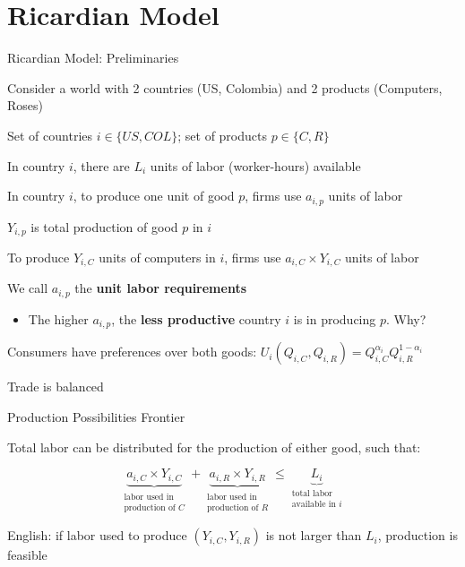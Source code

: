 \documentclass[notes,11pt, aspectratio=169, xcolor=table]{beamer}
\newenvironment{wideitemize}{\itemize\addtolength{\itemsep}{10pt}}{\enditemize}
\begin{document}
\section{Ricardian Model}

\begin{frame}{Ricardian Model: Preliminaries}
\begin{wideitemize}
        \item Consider a world with 2 countries (US, Colombia) and 2 products (Computers, Roses)
        \item Set of countries $i \in \{ US, COL\}$; set of products $p \in \{ C, R\}$
        \item In country $i$, there are $L_i$ units of labor (worker-hours) available 
        \item In country $i$, to produce one unit of good $p$, firms use $a_{i,p}$ units of labor
        \item $Y_{i,p}$ is total production of good $p$ in $i$
        \item To produce $Y_{i,C}$ units of computers in $i$, firms use $a_{i,C} \times Y_{i,C}$ units of labor 
        \item We call $a_{i,p}$ the \textbf{unit labor requirements}
        \begin{itemize}
            \item The higher $a_{i,p}$, the \textbf{less productive} country $i$ is in producing $p$. Why?
        \end{itemize}
        \item Consumers have preferences over both goods: $U_i(Q_{i,C},Q_{i,R}) = Q_{i,C}^{\alpha_i} Q_{i,R}^{1-\alpha_i}$
        \item Trade is balanced
    \end{wideitemize}
\end{frame}


\begin{frame}{Production Possibilities Frontier}
\begin{wideitemize}
        \item Total labor can be distributed for the production of either good, such that:

        \begin{equation*}
            \underbrace{a_{i,C} \times Y_{i,C}}_{\substack{\text{labor used in} \\ \text{production of } C}} + \underbrace{a_{i,R} \times Y_{i,R}}_{\substack{\text{labor used in} \\ \text{production of } R}} \le \underbrace{L_i}_{\substack{\text{total labor} \\ \text{available in } i}}
        \end{equation*}

        \item English: if labor used to produce $(Y_{i,C}, Y_{i,R})$ is not larger than $L_i$, production is feasible
    \end{wideitemize}
\end{frame}
\end{document}
